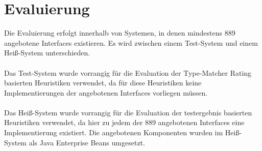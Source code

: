 \chapter{Evaluierung}\label{chap_evaluation}
Die Evaluierung erfolgt innerhalb von Systemen, in denen mindestens 889 angebotene Interfaces existieren. Es wird zwischen einem Test-System und einem Heiß-System unterschieden.\\\\
Das Test-System wurde vorrangig für die Evaluation der Type-Matcher Rating basierten Heuristiken verwendet, da für diese Heuristiken keine Implementierungen der angebotenen Interfaces vorliegen müssen.\\\\
Das Heiß-System wurde vorrangig für die Evaluation der testergebnis basierten Heuristiken verwendet, da hier zu jedem der 889 angebotenen Interfaces eine Implementierung existiert. Die angebotenen Komponenten wurden  im Heiß-System als Java Enterprise Beans umgesetzt.

